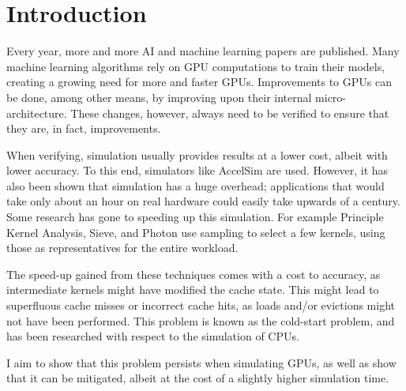 \chapter{Introduction}\label{ch:introduction}

Every year, more and more AI and machine learning papers are published\cite{aiindex}.
Many machine learning algorithms rely on GPU computations to train their models, creating a growing need for more and faster GPUs.
Improvements to GPUs can be done, among other means, by improving upon their internal micro-architecture.
These changes, however, always need to be verified to ensure that they are, in fact, improvements.

When verifying, simulation usually provides results at a lower cost, albeit with lower accuracy.
To this end, simulators like AccelSim\cite{accelsim} are used.
However, it has also been shown that simulation has a huge overhead; applications that would take only about an hour on real hardware could easily take upwards of a century\cite{pks}.
Some research has gone to speeding up this simulation.
For example Principle Kernel Analysis\cite{pks}, Sieve\cite{sieve}, and Photon\cite{photon} use sampling to select a few kernels, using those as representatives for the entire workload.

The speed-up gained from these techniques comes with a cost to accuracy, as intermediate kernels might have modified the cache state.
This might lead to superfluous cache misses or incorrect cache hits, as loads and/or evictions might not have been performed.
This problem is known as the cold-start problem, and has been researched with respect to the simulation of CPUs\cite{coolsim}.

I aim to show that this problem persists when simulating GPUs, as well as show that it can be mitigated, albeit at the cost of a slightly higher simulation time.